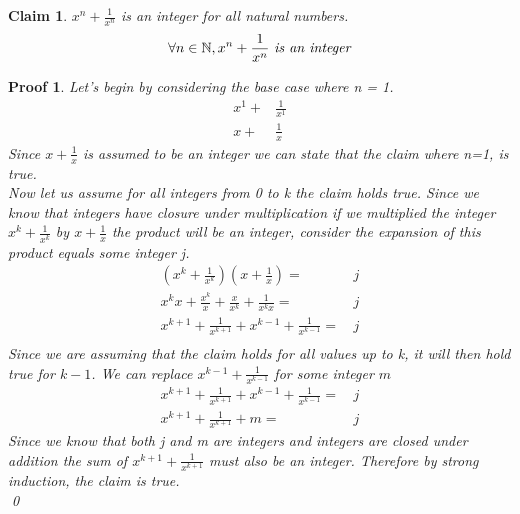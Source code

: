 \documentclass{article}
\newtheorem*{claim}{Claim}
\newtheorem*{poof}{Proof}
\begin{document}
\begin{claim}
     $x^n+\frac{1}{x^n}$ is an integer for all natural numbers.
     $$\forall n \in \mathbb{N}, x^n +\frac{1}{x^n}\text{ \emph{is an integer}}$$
\end{claim}
\begin{poof}
     Let's begin by considering the base case where n = 1.
    \begin{align*}
         x^1+&\frac{1}{x^1}\\         x+&\frac{1}{x}
    \end{align*}
    Since $x+\frac{1}{x}$ is assumed to be an integer we can state that the claim where n=1, is true.
    \\
    
    \noindent Now let us assume for all integers from 0 to k the claim holds true. Since we know that integers have closure under multiplication if we multiplied the integer $x^k+\frac{1}{x^k}$ by $x+\frac{1}{x}$ the product will be an integer, consider the expansion of this product equals some integer j.
    \begin{align*}
        (x^k+\frac{1}{x^k})(x+\frac{1}{x})=&\,j\\
        x^kx+\frac{x^k}{x}+\frac{x}{x^k}+\frac{1}{x^kx}=&\,j\\
        x^{k+1}+\frac{1}{x^{k+1}}+x^{k-1}+\frac{1}{x^{k-1}}=&\,j\\
    \end{align*}
    Since we are assuming that the claim holds for all values up to k, it will then hold true for $k-1$. We can replace $x^{k-1}+\frac{1}{x^{k-1}}$ for some integer $m$
    \begin{align*}
        x^{k+1}+\frac{1}{x^{k+1}}+x^{k-1}+\frac{1}{x^{k-1}}=&\,j\\
        x^{k+1}+\frac{1}{x^{k+1}}+m=&\,j
    \end{align*}
    Since we know that both j and m are integers and integers are closed under addition the sum of $x^{k+1}+\frac{1}{x^{k+1}}$ must also be an integer. Therefore by strong induction, the claim is true.
    \\
    \qed
\end{poof}

\newpage
\end{document}
